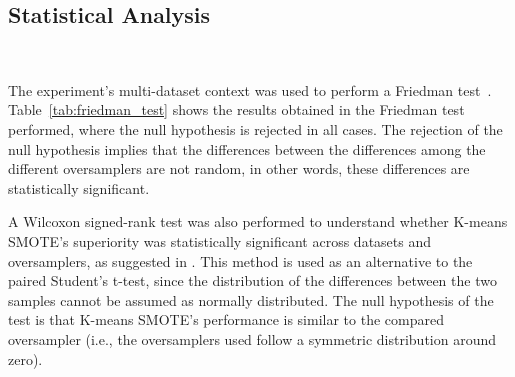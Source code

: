 \documentclass[authoryear,preprint,12pt]{elsarticle}
\begin{document}
\begin{linenumbers}
\subsection{Statistical Analysis}~\label{sec:statistical_analysis}

The experiment's multi-dataset context was used to perform a Friedman
test~\citep{friedman1937use}. Table~\ref{tab:friedman_test} shows the results
obtained in the Friedman test performed, where the null hypothesis is rejected
in all cases. The rejection of the null hypothesis implies that the
differences between the differences among the different oversamplers are not
random, in other words, these differences are statistically significant.

\begin{table}[H]
    \caption{
        Results for Friedman test. Statistical significance is tested at a
        level of $\alpha = 0.05$. The null hypothesis is that there is no
        difference in the classification outcome across oversamplers.
    \vspace{-.6cm}}\label{tab:friedman_test}
\end{table}

A Wilcoxon signed-rank test \citep{wilcoxon1992} was also performed to
understand whether K-means SMOTE's superiority was statistically significant
across datasets and oversamplers, as suggested in \citep{Demsar2006}. This
method is used as an alternative to the paired Student's t-test, since the
distribution of the differences between the two samples cannot be assumed as
normally distributed. The null hypothesis of the test is that K-means SMOTE's
performance is similar to the compared oversampler (i.e., the oversamplers
used follow a symmetric distribution around zero).

\begin{table}[H]
    \caption{
        \textit{p-values} of the Wilcoxon signed-rank test. Boldface values
        are statistically significant at a significance level of $\alpha =
        0.05$.
    \vspace{-.6cm}}\label{tab:wilcoxon_test}
\end{table}



\end{linenumbers}
\end{document}
